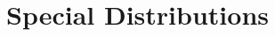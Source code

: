 \documentclass[../main.tex]{subfiles}
\begin{document}
\chapter{Special Distributions}
	
	
	
	
	
\end{document}
